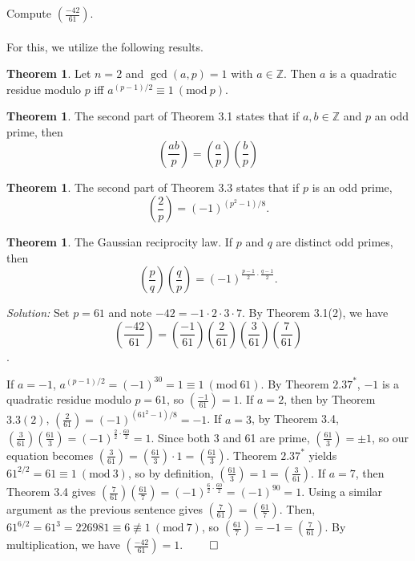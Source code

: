 \documentclass[12pt]{article}
\newcommand{\Mod}[1]{\ (\mathrm{mod}\ #1)}
\theoremstyle{definition}
\newcounter{customThm}
\renewcommand{\thecustomThm}{\arabic{customThm}}
\newtheorem{theorem}[customThm]{Theorem}
\theoremstyle{named}
\begin{document}
Compute $\left(\frac{-42}{61}\right)$. 
\\
\\
For this, we utilize the following results. 

\renewcommand{\thecustomThm}{2.37*}
\begin{theorem}
    Let $n = 2$ and $\gcd(a,p) = 1$ with $a \in \mathbb{Z}$. Then $a$ is a quadratic residue modulo $p$ iff $a^{(p-1)/2} \equiv 1 \Mod{p}$. 
\end{theorem}

\renewcommand{\thecustomThm}{3.1(2)}
\begin{theorem}
The second part of Theorem 3.1 states that if $a,b \in \mathbb{Z}$ and $p$ an odd prime, then
$$
\left(\frac{ab}{p}\right) = \left(\frac{a}{p}\right)\left(\frac{b}{p}\right)
$$
\end{theorem}

\renewcommand{\thecustomThm}{3.3(2)}
\begin{theorem}
    The second part of Theorem 3.3 states that if $p$ is an odd prime,
    $$
    \left(\frac{2}{p}\right) = (-1)^{\left(p^2 - 1\right)/8}.
    $$
\end{theorem}

\renewcommand{\thecustomThm}{3.4}
\begin{theorem}
    The Gaussian reciprocity law. If $p$ and $q$ are distinct odd primes, then 
    $$
    \left(\frac{p}{q}\right)\left(\frac{q}{p}\right) = (-1)^{\frac{p-1}{2} \cdot \frac{q-1}{2}}.
    $$
\end{theorem}

\textit{Solution:} Set $p=61$ and note $-42 = -1 \cdot 2 \cdot 3 \cdot 7$. By Theorem 3.1(2), we have 
$$
\left(\frac{-42}{61}\right) = \left(\frac{-1}{61}\right)\left(\frac{2}{61}\right)\left(\frac{3}{61}\right)\left(\frac{7}{61}\right)
$$.

If $a=-1$, $a^{(p-1)/2} = (-1)^{30} = 1 \equiv 1 \Mod{61}$. By Theorem $2.37^*$, $-1$ is a quadratic residue modulo $p=61$, so $\left(\frac{-1}{61}\right) = 1$. If $a=2$, then by Theorem $3.3(2)$, $\left(\frac{2}{61}\right) = (-1)^{(61^2 - 1)/8} = -1$. If $a=3$, by Theorem 3.4, $\left(\frac{3}{61}\right)\left(\frac{61}{3}\right) = (-1)^{\frac{2}{2} \cdot \frac{60}{2}} = 1$. Since both 3 and 61 are prime, $\left(\frac{61}{3}\right) = \pm 1$, so our equation becomes $\left(\frac{3}{61}\right) = \left(\frac{61}{3}\right) \cdot 1 = \left(\frac{61}{3}\right)$. Theorem $2.37^*$ yields $61^{2/2} = 61 \equiv 1 \Mod{3}$, so by definition, $\left(\frac{61}{3}\right) = 1 = \left(\frac{3}{61}\right)$. If $a=7$, then Theorem 3.4 gives $\left(\frac{7}{61}\right)\left(\frac{61}{7}\right) = (-1)^{\frac{6}{2} \cdot \frac{60}{2}} = (-1)^{90} = 1$. Using a similar argument as the previous sentence gives $\left(\frac{7}{61}\right) = \left(\frac{61}{7}\right)$. Then, $61^{6/2} = 61^3 = 226981 \equiv 6 \not\equiv 1 \Mod{7}$, so $\left(\frac{61}{7}\right) = -1 = \left(\frac{7}{61}\right)$. By multiplication, we have $\left(\frac{-42}{61}\right) = 1$. $\qed$ 

 
\end{document}
